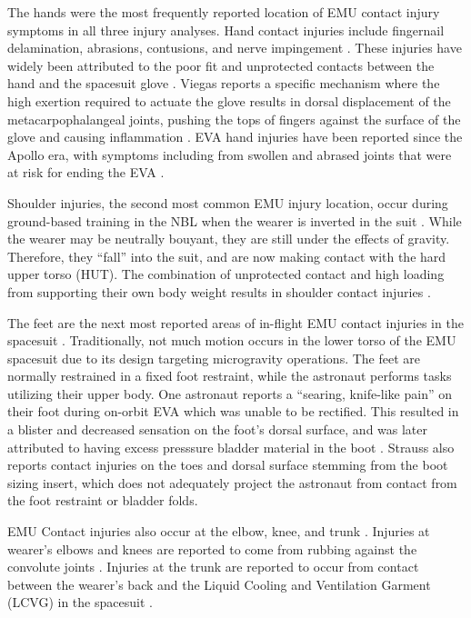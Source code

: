 \documentclass[defaultstyle,11pt]{comps}
\begin{document}
The hands were the most frequently reported location of EMU contact injury symptoms in all three injury analyses.
Hand contact injuries include fingernail delamination, abrasions, contusions, and nerve impingement \citep{Strauss2004, Viegas2004, Scheuring2012}.
These injuries have widely been attributed to the poor fit and unprotected contacts between the hand and the spacesuit glove \citep{Strauss2004, Viegas2004}.
Viegas reports a specific mechanism where the high exertion required to actuate the glove results in dorsal displacement of the metacarpophalangeal joints, pushing the tops of fingers against the surface of the glove and causing inflammation \citep{Viegas2004}.
EVA hand injuries have been reported since the Apollo era, with symptoms including from swollen and abrased joints that were at risk for ending the EVA \citep{Scheuring2012}.

Shoulder injuries, the second most common EMU injury location, occur during ground-based training in the NBL when the wearer is inverted in the suit \citep{Strauss2004, Viegas2004}.
While the wearer may be neutrally bouyant, they are still under the effects of gravity.
Therefore, they ``fall'' into the suit, and are now making contact with the hard upper torso (HUT).
The combination of unprotected contact and high loading from supporting their own body weight results in shoulder contact injuries \citep{Strauss2004, Viegas2004}.

The feet are the next most reported areas of in-flight EMU contact injuries in the spacesuit \citep{Scheuring2012}.
Traditionally, not much motion occurs in the lower torso of the EMU spacesuit due to its design targeting microgravity operations.
The feet are normally restrained in a fixed foot restraint, while the astronaut performs tasks utilizing their upper body.
One astronaut reports a ``searing, knife-like pain'' on their foot during on-orbit EVA which was unable to be rectified\citep{Scheuring2012}.
This resulted in a blister and decreased sensation on the foot's dorsal surface, and was later attributed to having excess presssure bladder material in the boot \citep{Scheuring2012}.
Strauss \citep{Strauss2004} also reports contact injuries on the toes and dorsal surface stemming from the boot sizing insert, which does not adequately project the astronaut from contact from the foot restraint or bladder folds.

EMU Contact injuries also occur at the elbow, knee, and trunk \citep{Strauss2004, Scheuring2012}. Injuries at wearer's elbows and knees are reported to come from rubbing against the convolute joints \citep{Strauss2004}.
Injuries at the trunk are reported to occur from contact between the wearer's back and the Liquid Cooling and Ventilation Garment (LCVG) in the spacesuit \citep{Strauss2004}.
\end{document}
